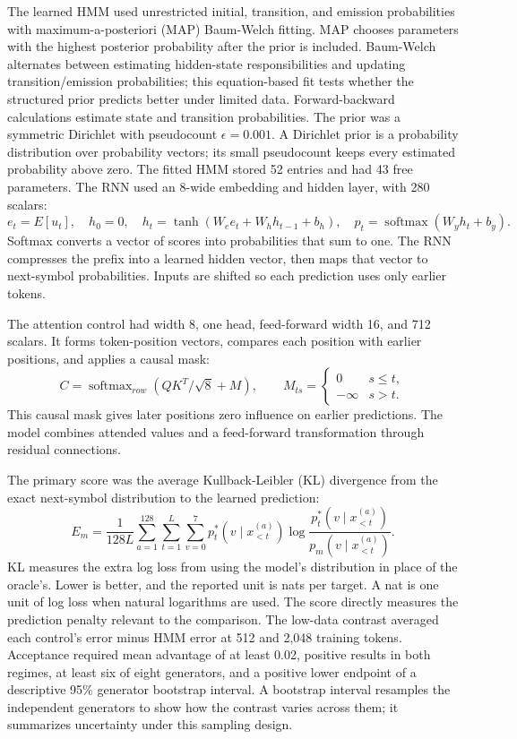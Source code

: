 The learned HMM used unrestricted initial, transition, and emission probabilities with maximum-a-posteriori (MAP) Baum-Welch fitting. MAP chooses parameters with the highest posterior probability after the prior is included. Baum-Welch alternates between estimating hidden-state responsibilities and updating transition/emission probabilities; this equation-based fit tests whether the structured prior predicts better under limited data. Forward-backward calculations estimate state and transition probabilities. The prior was a symmetric Dirichlet with pseudocount $\epsilon=0.001$. A Dirichlet prior is a probability distribution over probability vectors; its small pseudocount keeps every estimated probability above zero. The fitted HMM stored 52 entries and had 43 free parameters. The RNN used an 8-wide embedding and hidden layer, with 280 scalars:
\begin{equation}
e_t=E[u_t],\quad h_0=0,\quad h_t=\tanh(W_ee_t+W_hh_{t-1}+b_h),\quad p_t=\operatorname{softmax}(W_yh_t+b_y).
\end{equation}
Softmax converts a vector of scores into probabilities that sum to one. The RNN compresses the prefix into a learned hidden vector, then maps that vector to next-symbol probabilities. Inputs are shifted so each prediction uses only earlier tokens.

The attention control had width 8, one head, feed-forward width 16, and 712 scalars. It forms token-position vectors, compares each position with earlier positions, and applies a causal mask:
\begin{equation}
C=\operatorname{softmax}_{row}(QK^T/\sqrt8+M),\qquad M_{ts}=\begin{cases}0&s\le t,\\-\infty&s>t.\end{cases}
\end{equation}
This causal mask gives later positions zero influence on earlier predictions. The model combines attended values and a feed-forward transformation through residual connections.

The primary score was the average Kullback-Leibler (KL) divergence from the exact next-symbol distribution to the learned prediction:
\begin{equation}
E_m=\frac{1}{128L}\sum_{a=1}^{128}\sum_{t=1}^{L}\sum_{v=0}^{7}p_t^*(v\mid x_{<t}^{(a)})\log\frac{p_t^*(v\mid x_{<t}^{(a)})}{p_m(v\mid x_{<t}^{(a)})}.
\end{equation}
KL measures the extra log loss from using the model's distribution in place of the oracle's. Lower is better, and the reported unit is nats per target. A nat is one unit of log loss when natural logarithms are used. The score directly measures the prediction penalty relevant to the comparison. The low-data contrast averaged each control's error minus HMM error at 512 and 2,048 training tokens. Acceptance required mean advantage of at least 0.02, positive results in both regimes, at least six of eight generators, and a positive lower endpoint of a descriptive 95\% generator bootstrap interval. A bootstrap interval resamples the independent generators to show how the contrast varies across them; it summarizes uncertainty under this sampling design.


